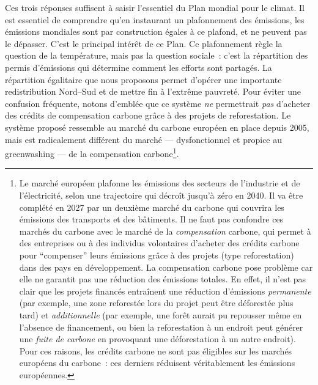 \documentclass[a5paper,french]{memoir}
\begin{document}
Ces trois réponses suffisent à saisir l'essentiel du Plan mondial pour le climat. Il est essentiel de comprendre qu'en instaurant un plafonnement des émissions, les émissions mondiales sont par construction égales à ce plafond, et ne peuvent pas le dépasser. 
C'est le principal intérêt de ce Plan. %
Ce plafonnement règle la question de la température, %
mais pas la question sociale~: c'est la répartition des permis d'émissions qui détermine comment les efforts sont partagés. La répartition égalitaire que nous proposons permet d'opérer une importante redistribution Nord--Sud et de mettre fin à l'extrême pauvreté. Pour éviter une confusion fréquente, notons d'emblée que ce système \textit{ne} permettrait \textit{pas} d'acheter des crédits de compensation carbone grâce à des projets de reforestation. Le système proposé ressemble au marché du carbone européen en place depuis 2005, mais est radicalement différent du marché --- dysfonctionnel et propice au greenwashing --- de la compensation carbone\footnote{Le marché européen plafonne les émissions des secteurs de l'industrie et de l'électricité, selon une trajectoire qui décroît jusqu'à zéro en 2040. Il va être complété en 2027 par un deuxième marché du carbone qui couvrira les émissions des transports et des bâtiments. Il ne faut pas confondre ces marchés du carbone avec le marché de la \textit{compensation} carbone, qui permet à des entreprises ou à des individus volontaires d'acheter des crédits carbone pour ``compenser'' leurs émissions grâce à des projets (type reforestation) dans des pays en développement. La compensation carbone pose problème car elle ne garantit pas une réduction des émissions totales. En effet, il n'est pas clair que les projets financés entraînent une réduction d'émissions \textit{permanente} (par exemple, une zone reforestée lors du projet peut être déforestée plus tard) et \textit{additionnelle} (par exemple, une forêt aurait pu repousser même en l'absence de financement, ou bien la reforestation à un endroit peut générer une \textit{fuite de carbone} en provoquant une déforestation à un autre endroit). Pour ces raisons, les crédits carbone ne sont pas éligibles sur les marchés européens du carbone~: ces derniers réduisent véritablement les émissions européennes.}.
\end{document}
